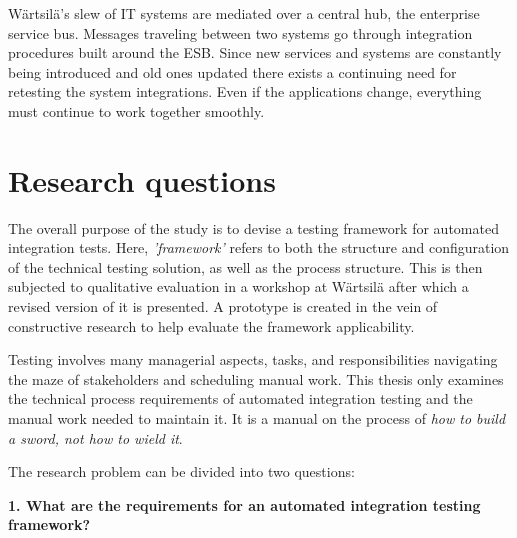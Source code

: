\documentclass[12pt,a4paper,oneside,pdftex]{report}
\begin{document}
Wärtsilä's slew of IT systems are mediated over a central hub, the enterprise service bus. Messages traveling between two systems go through integration procedures built around the ESB. Since new services and systems are constantly being introduced and old ones updated there exists a continuing need for retesting the system integrations. Even if the applications change, everything must continue to work together smoothly. %


\section{Research questions}

The overall purpose of the study is to devise a testing framework for automated integration tests. Here, \emph{'framework'} refers to both the structure and configuration of the technical testing solution, as well as the process structure. This is then subjected to qualitative evaluation in a workshop at Wärtsilä after which a revised version of it is presented. A prototype is created in the vein of constructive research to help evaluate the framework applicability.

Testing involves many managerial aspects, tasks, and responsibilities navigating the maze of stakeholders and scheduling manual work. This thesis only examines the technical process requirements of automated integration testing and the manual work needed to maintain it. It is a manual on the process of \emph{how to build a sword, not how to wield it}.

The research problem can be divided into two questions: \\

\begin{adjustwidth}{2.5em}{0pt}
\textbf{1. What are the requirements for an automated integration testing framework?} \\
\end{adjustwidth}
\end{document}

